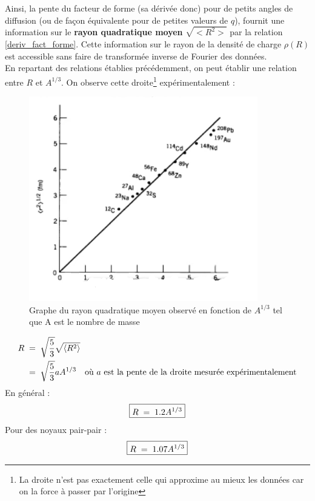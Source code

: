 Ainsi, la pente du facteur de forme (sa dérivée donc) pour de petits angles de diffusion (ou de façon équivalente pour de petites valeurs de $q$), fournit une information sur le \textbf{rayon quadratique moyen} $\sqrt{<R^2>}$ par la relation \ref{deriv_fact_forme}. Cette information sur le rayon de la densité de charge $\rho(R)$ est accessible sans faire de transformée inverse de Fourier des données.\\
En repartant des relations établies précédemment, on peut établir une relation entre $R$ et $A^{1/3}$. On observe cette droite\footnote{La droite n'est pas exactement celle qui approxime au mieux les données car on la force à passer par l'origine} expérimentalement :
\begin{figure}[H]
    \centering
    \includegraphics[scale=1.2]{Images4/DroiteAR.PNG}
    \caption{Graphe du rayon quadratique moyen observé en fonction de $A^{1/3}$ tel que A est le nombre de masse}
\end{figure}
\begin{align*}
    R &\; = \; \sqrt{\dfrac{5}{3}} \sqrt{\expval{R^2}}\\
    &\; = \; \sqrt{\dfrac{5}{3}} aA^{1/3} \quad \text{où $a$ est la pente de la droite mesurée expérimentalement}
\end{align*}
En général :
\begin{equation*}
    \boxed{
        R \; = \; 1.2 A^{1/3}
    }
\end{equation*}
Pour des noyaux pair-pair :
\begin{equation*}
    \boxed{
        R \; = \; 1.07 A^{1/3}
    }
\end{equation*}



